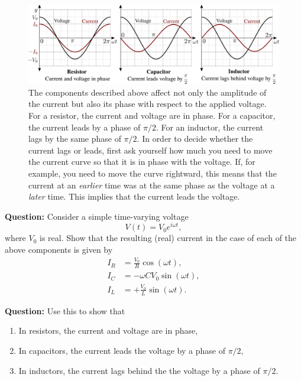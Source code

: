 \begin{figure}[!htb]
    \centering
    \includegraphics[width=\textwidth]{figs/electronics-circuits/electronics-components-phase-graphs.png}
    \caption{The components described above affect not only the amplitude of the current but also its phase with respect to the applied voltage. For a resistor, the current and voltage are in phase. For a capacitor, the current leads by a phase of $\pi/2$. For an inductor, the current lags by the same phase of $\pi/2$. In order to decide whether the current lags or leads, first ask yourself how much you need to move the current curve so that it is in phase with the voltage. If, for example, you need to move the curve rightward, this means that the current at an \textsl{earlier} time was at the same phase as the voltage at a \textsl{later} time. This implies that the current leads the voltage.  }
    \label{fig:phase-graphs}
\end{figure}



\begin{question}
    \textbf{Question:} Consider a simple time-varying voltage 
    \begin{equation}
        V(t) = V_0 e^{i\omega t},
    \end{equation}
    where $V_0$ is real. Show that the resulting (real) current in the case of each of the above components is given by
    \begin{equation}
        \begin{aligned}
            I_R &= \frac{V_0}{R} \cos(\omega t),\\[10pt]
            I_C &= - \omega C V_0 \sin(\omega t),\\[10pt]
            I_L &= + \frac{V_0}{L} \sin(\omega t).
        \end{aligned}
    \end{equation}

    \textbf{Question:} Use this to show that
    \vspace{-\parskip}
    \begin{enumerate}
    \itemsep0em
        \item In resistors, the current and voltage are in phase,
        \item In capacitors, the current leads the voltage by a phase of $\pi/2$,
        \item In inductors, the current lags behind the the voltage by a phase of $\pi/2$.  
    \end{enumerate}
\end{question}

